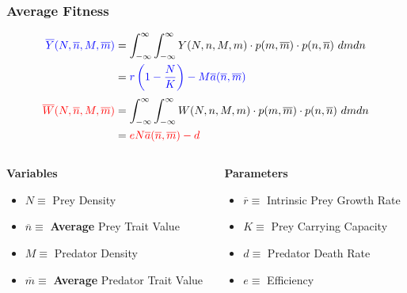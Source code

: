 \documentclass[10pt]{beamer}
\begin{document}
\begin{frame}
	\frametitle{Average Fitness}
	\begin{align*}
	{\color{blue}\overline{Y}(N, \overline{n}, M, \overline{m})} &= \int_{-\infty}^{\infty}\int_{-\infty}^{\infty} Y(N, n, M, m) \cdot p(m, \overline{m}) \cdot p(n, \overline{n})\ dm dn \\
	&= {\color{blue}r\left(1 - \frac{N}{K}\right) - M\overline{a}(\overline{n}, \overline{m})} \\[.1cm]
	{\color{red}\overline{W}(N, \overline{n}, M, \overline{m})} &= \int_{-\infty}^{\infty}\int_{-\infty}^{\infty} W(N, n, M, m) \cdot p(m, \overline{m}) \cdot p(n, \overline{n})\ dm dn \\
	&= {\color{red}eN\overline{a}(\overline{n}, \overline{m}) - d}
	\end{align*}
	\begin{columns}
		\begin{column}{0.45\textwidth}
			{\bf Variables}
			\begin{itemize}
				\item \footnotesize{\color{blue}$N \equiv $ Prey Density}
				\item {\color{blue}$\overline{n} \equiv $ {\bf Average} Prey Trait Value}
				\item {\color{red}$M \equiv $ Predator Density}
				\item {\color{red}$\overline{m} \equiv $ {\bf Average} Predator Trait  Value}
			\end{itemize}
		\end{column}
		\begin{column}{0.55\textwidth}
			{\bf Parameters}
			\begin{itemize}
				\item \footnotesize$\overline{r} \equiv $ Intrinsic Prey Growth Rate
				\item $K \equiv $ Prey Carrying Capacity
				\item $d \equiv $ Predator Death Rate
				\item $e \equiv $ Efficiency
			\end{itemize}
		\end{column}
	\end{columns}
\end{frame}
\end{document}
